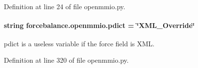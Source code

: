 Definition at line 24 of file openmmio.\-py.

\hypertarget{namespaceforcebalance_1_1openmmio_af225f2cfdcfd96ebd1d3175c8770a850}{
\paragraph[{pdict}]{\setlength{\rightskip}{0pt plus 5cm}string forcebalance.\-openmmio.\-pdict = \char`\"{}X\-M\-L\-\_\-\-Override\char`\"{}}}\label{namespaceforcebalance_1_1openmmio_af225f2cfdcfd96ebd1d3175c8770a850}


pdict is a useless variable if the force field is X\-M\-L. 



Definition at line 320 of file openmmio.\-py.

